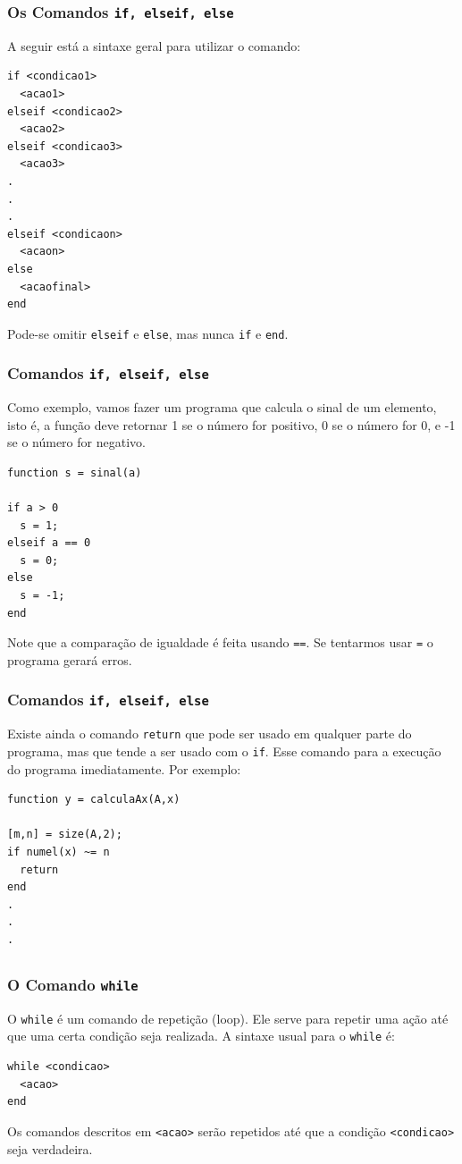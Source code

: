\documentclass{beamer}
\begin{document}
\begin{frame}[fragile]
\frametitle{Os Comandos {\tt if, elseif, else}}

A seguir est\'a a sintaxe geral para utilizar o comando:

{\scriptsize
\begin{verbatim}
if <condicao1>
  <acao1>
elseif <condicao2>
  <acao2>
elseif <condicao3>
  <acao3>
.
.
.
elseif <condicaon>
  <acaon>
else
  <acaofinal>
end
\end{verbatim}
}
Pode-se omitir {\tt elseif} e {\tt else}, mas nunca {\tt if} e {\tt end}.

\end{frame}

\begin{frame}[fragile]
\frametitle{Comandos {\tt if, elseif, else}}

Como exemplo, vamos fazer um programa que calcula o sinal de um elemento, isto \'e, a fun\c{c}\~ao deve retornar 1 se o n\'umero for positivo, 0 se o n\'umero for 0, e -1 se o n\'umero for negativo.
\pause
{\scriptsize
\begin{verbatim}
function s = sinal(a)

if a > 0
  s = 1;
elseif a == 0
  s = 0;
else
  s = -1;
end
\end{verbatim}
}

Note que a compara\c{c}\~ao de igualdade \'e feita usando {\tt ==}. Se tentarmos usar {\tt =} o programa gerar\'a erros.
\end{frame}

\begin{frame}[fragile]
\frametitle{Comandos {\tt if, elseif, else}}

Existe ainda o comando {\tt return} que pode ser usado em qualquer parte do programa, mas que tende a ser usado com o {\tt if}. Esse comando para a execu\c{c}\~ao do programa imediatamente. Por exemplo:
\pause

{\small
\begin{verbatim}
function y = calculaAx(A,x)

[m,n] = size(A,2);
if numel(x) ~= n
  return
end
.
.
.

\end{verbatim}
}
\end{frame}

\subsection[O Comando while]{}

\begin{frame}[fragile]
\frametitle{O Comando {\tt while}}

O {\tt while} \'e um comando de repeti\c{c}\~ao (loop). Ele serve para repetir uma a\c{c}\~ao at\'e que uma certa condi\c{c}\~ao seja realizada. A sintaxe usual para o {\tt while} \'e:

\begin{verbatim}
while <condicao>
  <acao>
end
\end{verbatim}

Os comandos descritos em {\tt <acao>} ser\~ao repetidos at\'e que a condi\c{c}\~ao {\tt <condicao>} seja verdadeira.

\end{frame}
\end{document}
